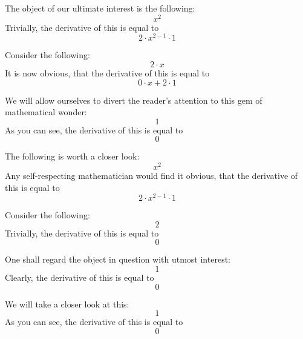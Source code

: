\documentclass{article}
\begin{document}
The object of our ultimate interest is the following:
\begin{equation}
x ^{2 } 
\end{equation}
Trivially, the derivative of this is equal to
\begin{equation}
2 \cdot x ^{2 - 1 } \cdot 1 
\end{equation}

Consider the following:
\begin{equation}
2 \cdot x 
\end{equation}
It is now obvious, that the derivative of this is equal to
\begin{equation}
0 \cdot x + 2 \cdot 1 
\end{equation}

We will allow ourselves to divert the reader's attention to this gem of mathematical wonder:
\begin{equation}
1 
\end{equation}
As you can see, the derivative of this is equal to
\begin{equation}
0 
\end{equation}

The following is worth a closer look:
\begin{equation}
x ^{2 } 
\end{equation}
Any self-respecting mathematician would find it obvious, that the derivative of this is equal to
\begin{equation}
2 \cdot x ^{2 - 1 } \cdot 1 
\end{equation}

Consider the following:
\begin{equation}
2 
\end{equation}
Trivially, the derivative of this is equal to
\begin{equation}
0 
\end{equation}

One shall regard the object in question with utmost interest:
\begin{equation}
1 
\end{equation}
Clearly, the derivative of this is equal to
\begin{equation}
0 
\end{equation}

We will take a closer look at this:
\begin{equation}
1 
\end{equation}
As you can see, the derivative of this is equal to
\begin{equation}
0 
\end{equation}
\end{document}
